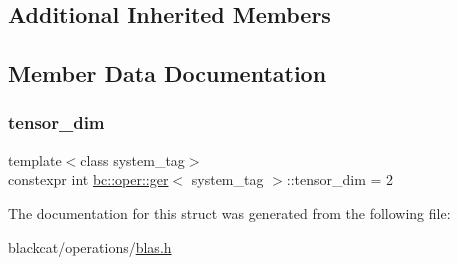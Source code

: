 \subsection*{Additional Inherited Members}


\subsection{Member Data Documentation}
\mbox{\label{structbc_1_1oper_1_1ger_a83b7b2f9097d8ada13047fa19de36f1a}} 
\subsubsection{\texorpdfstring{tensor\+\_\+dim}{tensor\_dim}}
{\footnotesize\ttfamily template$<$class system\+\_\+tag$>$ \\
constexpr int \hyperlink{structbc_1_1oper_1_1ger}{bc\+::oper\+::ger}$<$ system\+\_\+tag $>$\+::tensor\+\_\+dim = 2\hspace{0.3cm}{\ttfamily [static]}}



The documentation for this struct was generated from the following file\+:\begin{DoxyCompactItemize}
\item 
blackcat/operations/\hyperlink{operations_2blas_8h}{blas.\+h}\end{DoxyCompactItemize}

